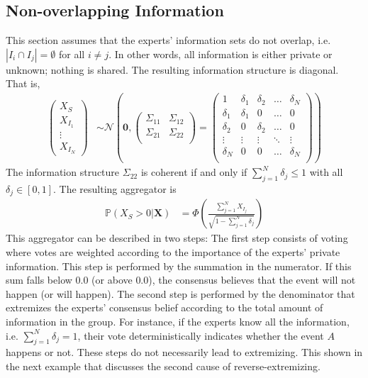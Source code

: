 \documentclass[11pt]{article}
\renewcommand{\P}{\mathbb{P}}
\theoremstyle{definition}
\theoremstyle{definition}
\begin{document}
\subsection{Non-overlapping Information}
\label{nonoverlap}
This section assumes that the experts' information sets do not overlap, i.e.   $|I_{i} \cap I_{j}| = \emptyset$ for all $i \neq j$. In other words, all information is either private or unknown; nothing is shared. The resulting information structure is diagonal.  That is,
\begin{align*}
\left(\begin{matrix} X_{S} \\ X_{I_1}\\ \vdots \\ X_{I_N} \end{matrix}\right) &\sim \mathcal{N}\left( 
 \boldsymbol{0}, \left(\begin{matrix} 
\Sigma_{11} & \Sigma_{12}\\
\Sigma_{21} & \Sigma_{22}\\
 \end{matrix}\right) 
 =
 \left(\begin{array}{c|cccc}
1 & \delta_1 & \delta_2 & \dots & \delta_N  \\ \hline
\delta_1 & \delta_1 &0 & \dots & 0   \\ 
\delta_2 & 0 & \delta_2 & \dots & 0  \\ 
\vdots & \vdots & \vdots & \ddots & \vdots  \\ 
\delta_N & 0 & 0 & \dots & \delta_N\\ 
 \end{array}\right)\right)
\end{align*}
The information structure $\Sigma_{22}$  is coherent if and only if $\sum_{j=1}^N \delta_j \leq 1$ with all $\delta_j \in [0,1]$. The resulting aggregator is 
\begin{align}
\P\left(X_{S} > 0 | \boldsymbol{X}\right) &= \Phi\left( \frac{\sum_{j=1}^N X_{I_j}}{\sqrt{1 - \sum_{j=1}^N \delta_j}}\right) \label{VotingAggre}
\end{align}
This aggregator can be described in two steps: The first step consists of voting where votes are weighted according to the importance of the experts' private information. This step is performed by the summation in the numerator. If this sum falls below $0.0$ (or above $0.0$), the consensus believes that the event will not happen (or will happen). The second step is performed by the denominator that extremizes the experts'  consensus belief according to the total amount of information in the group. For instance, if the experts know all the information, i.e. $\sum_{j=1}^N \delta_j = 1$, their vote deterministically indicates whether the event $A$ happens or not. These steps do not necessarily lead to extremizing. This shown in the next example that discusses the second cause of reverse-extremizing.
\end{document}
